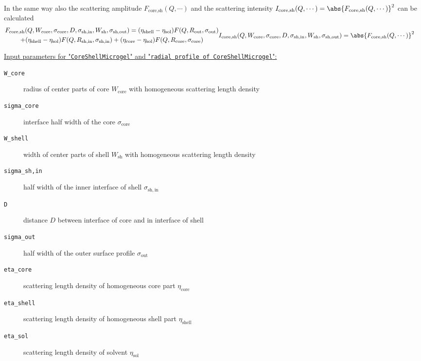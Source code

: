 In the same way also the scattering amplitude $F_\textrm{core,sh}(Q,\cdots)$ and the scattering intensity
$I_\textrm{core,sh}(Q,\cdots)=\abs{F_\textrm{core,sh}(Q,\cdots)}^2$ can be calculated
\begin{subequations}
\begin{multline}
F_\textrm{core,sh}(Q,W_\textrm{core},\sigma_\textrm{core},D,\sigma_\textrm{sh,in},W_\textrm{sh},\sigma_\textrm{sh,out}) =
  (\eta_\textrm{shell}-\eta_\textrm{sol}) F(Q,R_\textrm{out},\sigma_\textrm{out}) \\
+ (\eta_\textrm{shell}-\eta_\textrm{sol}) F(Q,R_\textrm{sh,in},\sigma_\textrm{sh,in})
+ (\eta_\textrm{core} -\eta_\textrm{sol}) F(Q,R_\textrm{core},\sigma_\textrm{core})
\end{multline}
\begin{align}
I_\textrm{core,sh}(Q,W_\textrm{core},\sigma_\textrm{core},D,\sigma_\textrm{sh,in},W_\textrm{sh},\sigma_\textrm{sh,out}) &=
\abs{F_\textrm{core,sh}(Q,\cdots)}^2
\end{align}
\end{subequations}

\vspace{5mm}

\noindent
\uline{Input parameters for "\texttt{CoreShellMicrogel}" and "\texttt{radial profile of CoreShellMicrogel}":}
\begin{description}
    \item[\texttt{W\_core}] radius of center parts of core $W_\textrm{core}$ with homogeneous scattering length density
    \item[\texttt{sigma\_core}] interface half width of the core $\sigma_\mathrm{core}$
    \item[\texttt{W\_shell}] width of center parts of shell $W_\textrm{sh}$ with homogeneous scattering length density
    \item[\texttt{sigma\_sh,in}] half width of the inner interface of shell $\sigma_\mathrm{sh,in}$
    \item[\texttt{D}] distance $D$ between interface of core and in interface of shell
    \item[\texttt{sigma\_out}] half width of the outer surface profile $\sigma_\mathrm{out}$
    \item[\texttt{eta\_core}] scattering length density of homogeneous core part $\eta_\textrm{core}$
    \item[\texttt{eta\_shell}] scattering length density of homogeneous shell part $\eta_\textrm{shell}$
    \item[\texttt{eta\_sol}] scattering length density of solvent $\eta_\textrm{sol}$
\end{description}

